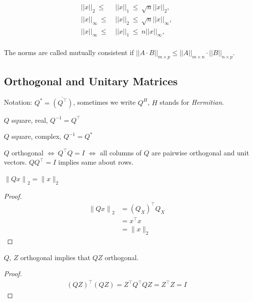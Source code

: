 \documentclass[11pt]{article}
\numberwithin{equation}{section}
\begin{document}
\begin{lemma}
    \begin{align*}
        ||x||_2 \ \leq \ &||x||_1 \ \leq \ \sqrt{n}||x||_2,\\
        ||x||_\infty \ \leq \ &||x||_2 \ \leq \ \sqrt{n}||x||_\infty,\\
        ||x||_\infty \ \leq \ &||x||_1 \ \leq \ n||x||_\infty,\\
    \end{align*}
\end{lemma}

\begin{definition}
    The norms are called mutually consistent if $||A\cdot B||_{m\times p}\leq ||A||_{m\times n}\cdot ||B||_{n\times p}$.
\end{definition}

\subsection{Orthogonal and Unitary Matrices}
Notation: $Q^{*}=\overline{\left(Q^{\top}\right)}$, sometimes we write $Q^H$, $H$ stands for \textit{Hermitian}.
\begin{definition}[Orthogonal]
    $Q$ square, real, $Q^{-1}=Q^{\top}$
\end{definition}
\begin{definition}[Unitary]
    $Q$ square, complex, $Q^{-1}=Q^{*}$
\end{definition}
\begin{fact}
    $Q$ orthogonal $\Longleftrightarrow \ Q^{\top} Q=I$ $\Longleftrightarrow$ all columns of $Q$ are pairwise orthogonal and unit vectors.
    $QQ^\top = I$ implies same about rows.
\end{fact}

\begin{theorem}\label{thm:pythagorean}
    $\left\|Qx\right\|_2 = \| x \|_{2}$
    \begin{proof}
        \begin{align*}
            \left\|Qx\right\|_2  &= \left(Q_{X}\right)^{\top} Q_{X} \\
            &= x^{\top} x \\
            &= \| x \|_{2}
        \end{align*}
    \end{proof}
\end{theorem}
\begin{fact}
    $Q$, $Z$ orthogonal implies that $QZ$ orthogonal.
    \begin{proof}
        \begin{align*}
            (Q Z)^{\top}(Q Z)= Z^\top Q^\top QZ = Z^\top Z = I
        \end{align*}
    \end{proof}
\end{fact}
\end{document}

